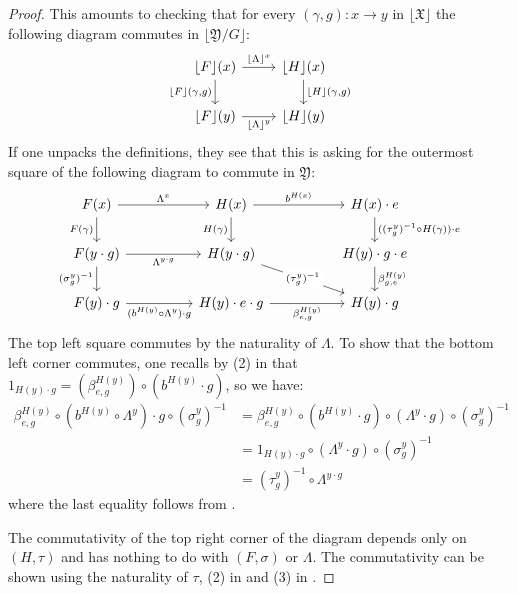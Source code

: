 \documentclass[12pt, final]{amsart}
\theoremstyle{remark}
\theoremstyle{definition}
\theoremstyle{plain}
\newcommand{\fX}{{\mathfrak X}}
\newcommand{\fY}{{\mathfrak Y}}
\begin{document}
\begin{proof}
    This amounts to checking that for every $(\gamma,g):x \to y$ in $\lfloor \fX\rfloor$
    the following diagram commutes in $\lfloor \fY/G\rfloor$: 
    $$
    \begin{tikzcd}
        {\lfloor F\rfloor(x)} & {\lfloor H\rfloor(x)} \\
        {\lfloor F\rfloor(y)} & {\lfloor H\rfloor(y)}
        \arrow["{\lfloor \Lambda\rfloor^{x}}", from=1-1, to=1-2]
        \arrow["{\lfloor F\rfloor(\gamma,g)}"', from=1-1, to=2-1]
        \arrow["{\lfloor H\rfloor(\gamma,g)}", from=1-2, to=2-2]
        \arrow["{\lfloor \Lambda\rfloor^{y}}"', from=2-1, to=2-2]
    \end{tikzcd}
    $$
    If one unpacks the definitions, they see that this is asking for the 
    outermost square of the following diagram to commute in $\fY$:
    $$
    \begin{tikzcd}[column sep=huge]
        {F(x)} & {H(x)} & {H(x)\cdot e} \\
        {F(y\cdot g)} & {H(y\cdot g)} & {H(y)\cdot g \cdot e} \\
        {F(y)\cdot g} & {H(y)\cdot e \cdot g} & {H(y)\cdot g}
        \arrow["{\Lambda^x}", from=1-1, to=1-2]
        \arrow["{F(\gamma)}"', from=1-1, to=2-1]
        \arrow["{b^{H(x)}}", from=1-2, to=1-3]
        \arrow["{H(\gamma)}"', from=1-2, to=2-2]
        \arrow["{((\tau_{g}^{y})^{-1}\circ H(\gamma))\cdot e}", from=1-3, to=2-3]
        \arrow["{\Lambda^{y\cdot g}}"', from=2-1, to=2-2]
        \arrow["{(\sigma_{g}^y)^{-1}}"', from=2-1, to=3-1]
        \arrow["{(\tau_{g}^{y})^{-1}}"{description}, from=2-2, to=3-3]
        \arrow["{\beta_{g,e}^{H(y)}}", from=2-3, to=3-3]
        \arrow["{(b^{H(y)}\circ \Lambda^y)\cdot g}"', from=3-1, to=3-2]
        \arrow["{\beta_{e,g}^{H(y)}}"', from=3-2, to=3-3]
    \end{tikzcd}
    $$
    The top left square commutes by the naturality of $\Lambda$. 
    To show that the bottom left corner commutes, one recalls by (2) in  
    that $1_{H(y)\cdot g} = (\beta_{e,g}^{H(y)})\circ (b^{H(y)}\cdot g)$, so we have:
    \begin{align*}
        \beta_{e,g}^{H(y)}\circ(b^{H(y)}\circ\Lambda^y)\cdot g \circ (\sigma_{g}^{y})^{-1}
        &= \beta_{e,g}^{H(y)}\circ (b^{H(y)}\cdot g)\circ(\Lambda^y\cdot g) \circ (\sigma_{g}^{y})^{-1}\\
        &= 1_{H(y)\cdot g} \circ (\Lambda^y\cdot g) \circ (\sigma_{g}^{y})^{-1}\\
        &= (\tau_{g}^{y})^{-1}\circ \Lambda^{y\cdot g}
    \end{align*}  where the last equality follows from .  
    
    The commutativity of the 
    top right corner of the diagram depends only on $(H,\tau)$ and has nothing to do 
    with $(F,\sigma)$ or $\Lambda$. The commutativity can be shown using the naturality
    of $\tau$, (2) in  and (3) in .    
\end{proof}
\end{document}
